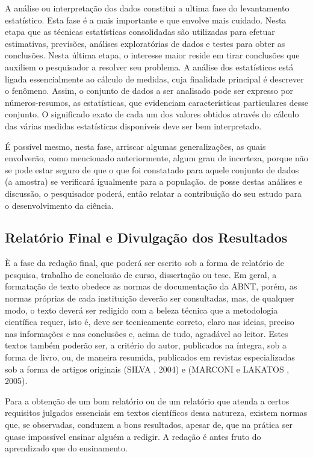 A análise ou interpretação dos dados constitui a ultima fase do levantamento estatístico. Esta fase é a mais importante e que
envolve mais cuidado. Nesta etapa que as técnicas estatísticas
consolidadas são utilizadas para efetuar estimativas, previsões,
análises exploratórias de dados e testes para obter as conclusões.
Nesta última etapa, o interesse maior reside em tirar conclusões
que auxiliem o pesquisador a resolver seu problema. A análise dos
estatísticos está ligada essencialmente ao cálculo de medidas,
cuja finalidade principal é descrever o fenômeno. Assim, o
conjunto de dados a ser analisado pode ser expresso por
números-resumos, as estatísticas, que evidenciam características
particulares desse conjunto. O significado exato de cada um dos
valores obtidos através do cálculo das várias medidas estatísticas
disponíveis deve ser bem interpretado. 

\newpage
É possível mesmo, nesta
fase, arriscar algumas generalizações, as quais envolverão, como
mencionado anteriormente, algum grau de incerteza, porque não se
pode estar seguro de que o que foi constatado para aquele conjunto
de dados (a amostra) se verificará igualmente para a população. de posse destas análises e discussão, o pesquisador poderá, então relatar a contribuição do seu estudo para o desenvolvimento da ciência.



\subsection{Relatório Final e Divulgação dos Resultados}

È a fase da redação final, que poderá ser escrito sob a
forma de relatório de pesquisa, trabalho de conclusão de curso,
dissertação ou tese. Em geral, a formatação de texto obedece as
normas de documentação da ABNT, porém, as normas próprias de cada
instituição deverão ser consultadas, mas, de qualquer modo, o
texto deverá ser redigido com a beleza técnica que a metodologia
científica requer, isto é, deve ser tecnicamente correto, claro
nas ideias, preciso nas informações e nas conclusões e, acima de
tudo, agradável ao leitor. Estes textos também poderão ser, a
critério do autor, publicados na íntegra, sob a forma de livro,
ou, de maneira resumida, publicados em revistas especializadas sob
a forma de artigos originais (SILVA , 2004) e (MARCONI e LAKATOS , 2005).\vskip0.3cm

Para a obtenção de um bom relatório ou de um relatório que atenda a certos requisitos julgados essenciais em textos científicos dessa natureza, existem normas que, se observadas, conduzem a bons resultados, apesar de, que na prática ser quase impossível ensinar alguém a redigir. A redação é antes fruto do aprendizado que do ensinamento.      





